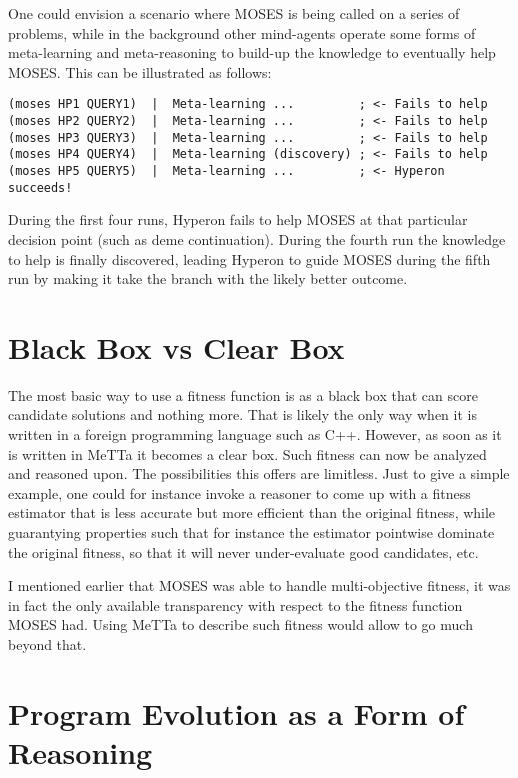 \documentclass[]{report}
\begin{document}
One could envision a scenario where MOSES is being called on a series
of problems, while in the background other mind-agents operate some
forms of meta-learning and meta-reasoning to build-up the knowledge to
eventually help MOSES.  This can be illustrated as follows:

{\small
\begin{verbatim}
(moses HP1 QUERY1)  |  Meta-learning ...         ; <- Fails to help
(moses HP2 QUERY2)  |  Meta-learning ...         ; <- Fails to help
(moses HP3 QUERY3)  |  Meta-learning ...         ; <- Fails to help
(moses HP4 QUERY4)  |  Meta-learning (discovery) ; <- Fails to help
(moses HP5 QUERY5)  |  Meta-learning ...         ; <- Hyperon succeeds!
\end{verbatim}
} During the first four runs, Hyperon fails to help MOSES at that
particular decision point (such as deme continuation).  During the
fourth run the knowledge to help is finally discovered, leading
Hyperon to guide MOSES during the fifth run by making it take the
branch with the likely better outcome.

\section{Black Box vs Clear Box}

The most basic way to use a fitness function is as a black box that
can score candidate solutions and nothing more.  That is likely the
only way when it is written in a foreign programming language such as
C++.  However, as soon as it is written in MeTTa it becomes a clear
box.  Such fitness can now be analyzed and reasoned upon.  The
possibilities this offers are limitless.  Just to give a simple
example, one could for instance invoke a reasoner to come up with a
fitness estimator that is less accurate but more efficient than the
original fitness, while guarantying properties such that for instance
the estimator pointwise dominate the original fitness, so that it will
never under-evaluate good candidates, etc.

I mentioned earlier that MOSES was able to handle multi-objective
fitness, it was in fact the only available transparency with respect
to the fitness function MOSES had.  Using MeTTa to describe such
fitness would allow to go much beyond that.

\section{Program Evolution as a Form of Reasoning}
\end{document}
